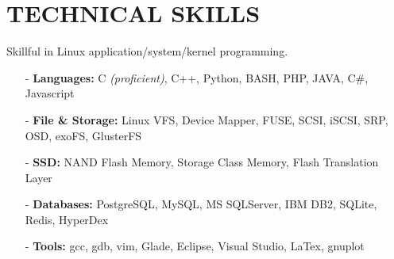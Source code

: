 \section{TECHNICAL SKILLS}
\vspace{0.03in}
Skillful in Linux application/system/kernel programming.
\begin{itemize}[leftmargin=*]
\setlength\itemsep{-0.02in}
\item[-] {\bf Languages:} C {\footnotesize \it (proficient)}, C++,
	Python, BASH, PHP, JAVA, C\#, Javascript
\item[-] {\bf File \& Storage:} Linux VFS, Device Mapper, FUSE, SCSI, iSCSI, SRP, OSD,
exoFS, GlusterFS
\item[-] {\bf SSD:} NAND Flash Memory, Storage Class Memory,
	Flash Translation Layer %
\item[-] {\bf Databases:} PostgreSQL, MySQL, MS SQLServer, IBM DB2, SQLite, Redis, HyperDex
\item[-] {\bf Tools:} gcc, gdb, vim, Glade, Eclipse, Visual Studio, LaTex, gnuplot
\end{itemize}

